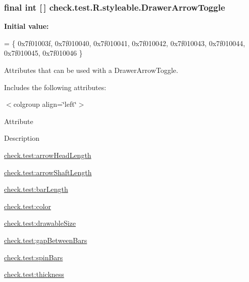 \subsubsection[{Drawer\+Arrow\+Toggle}]{\setlength{\rightskip}{0pt plus 5cm}final int \mbox{[}$\,$\mbox{]} check.\+test.\+R.\+styleable.\+Drawer\+Arrow\+Toggle\hspace{0.3cm}{\ttfamily [static]}}\label{classcheck_1_1test_1_1_r_1_1styleable_a3bd2348d01049d5d42d5b7f277abeec9}
{\bfseries Initial value\+:}
\begin{DoxyCode}
= \{
            0x7f01003f, 0x7f010040, 0x7f010041, 0x7f010042,
            0x7f010043, 0x7f010044, 0x7f010045, 0x7f010046
        \}
\end{DoxyCode}
Attributes that can be used with a Drawer\+Arrow\+Toggle. 

Includes the following attributes\+:

\begin{TabularC}{0}
\hline
\end{TabularC}
$<$colgroup align=\char`\"{}left\char`\"{}$>$ 

Attribute

Description 

{\ttfamily \hyperlink{classcheck_1_1test_1_1_r_1_1styleable_ac0647576f04a6d1d20c113fe5f620549}{check.\+test\+:arrow\+Head\+Length}}

{\ttfamily \hyperlink{classcheck_1_1test_1_1_r_1_1styleable_a5470f2b363de031a61f66e7cb6730f40}{check.\+test\+:arrow\+Shaft\+Length}}

{\ttfamily \hyperlink{classcheck_1_1test_1_1_r_1_1styleable_ad0c002a6830ad6d7027b2a71aaae6f7d}{check.\+test\+:bar\+Length}}

{\ttfamily \hyperlink{classcheck_1_1test_1_1_r_1_1styleable_aab0db7b5e25645f9ddc44b92a639dfa8}{check.\+test\+:color}}

{\ttfamily \hyperlink{classcheck_1_1test_1_1_r_1_1styleable_a4d2ffe9ec6395dfd049a6a31e683caea}{check.\+test\+:drawable\+Size}}

{\ttfamily \hyperlink{classcheck_1_1test_1_1_r_1_1styleable_a44d301c2d203c5db285393f8159327c4}{check.\+test\+:gap\+Between\+Bars}}

{\ttfamily \hyperlink{classcheck_1_1test_1_1_r_1_1styleable_a73da5fd0bc10c0ae2fa7bcb46d75899e}{check.\+test\+:spin\+Bars}}

{\ttfamily \hyperlink{classcheck_1_1test_1_1_r_1_1styleable_a3245f5a85d7d25f1960c495b486d78e6}{check.\+test\+:thickness}}

